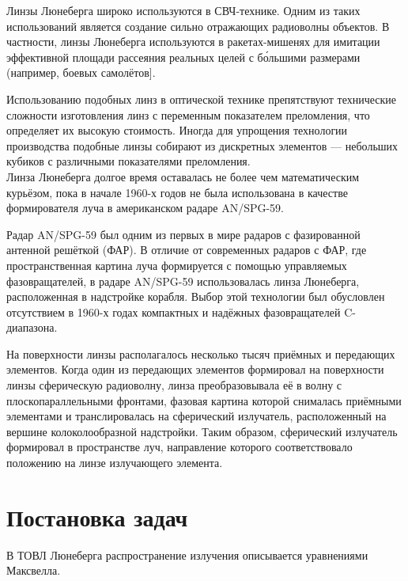 \documentclass{article}
\begin{document}
Линзы Люнеберга широко используются в СВЧ-технике. Одним из таких использований является создание сильно отражающих радиоволны объектов. В частности, линзы Люнеберга используются в ракетах-мишенях для имитации эффективной площади рассеяния реальных целей с бо́льшими размерами (например, боевых самолётов].

Использованию подобных линз в оптической технике препятствуют технические сложности изготовления линз с переменным показателем преломления, что определяет их высокую стоимость. Иногда для упрощения технологии производства подобные линзы собирают из дискретных элементов — небольших кубиков с различными показателями преломления.\\[10pt]

Линза Люнеберга долгое время оставалась не более чем математическим курьёзом, пока в начале 1960-х годов не была использована в качестве формирователя луча в американском радаре AN/SPG-59.

Радар AN/SPG-59 был одним из первых в мире радаров с фазированной антенной решёткой (ФАР). В отличие от современных радаров с ФАР, где пространственная картина луча формируется с помощью управляемых фазовращателей, в радаре AN/SPG-59 использовалась линза Люнеберга, расположенная в надстройке корабля. Выбор этой технологии был обусловлен отсутствием в 1960-х годах компактных и надёжных фазовращателей C-диапазона.

На поверхности линзы располагалось несколько тысяч приёмных и передающих элементов. Когда один из передающих элементов формировал на поверхности линзы сферическую радиоволну, линза преобразовывала её в волну с плоскопараллельными фронтами, фазовая картина которой снималась приёмными элементами и транслировалась на сферический излучатель, расположенный на вершине колоколообразной надстройки. Таким образом, сферический излучатель формировал в пространстве луч, направление которого соответствовало положению на линзе излучающего элемента.

\newpage

\section{Постановка задач}
В ТОВЛ Люнеберга распространение излучения описывается уравнениями Максвелла.
\end{document}
